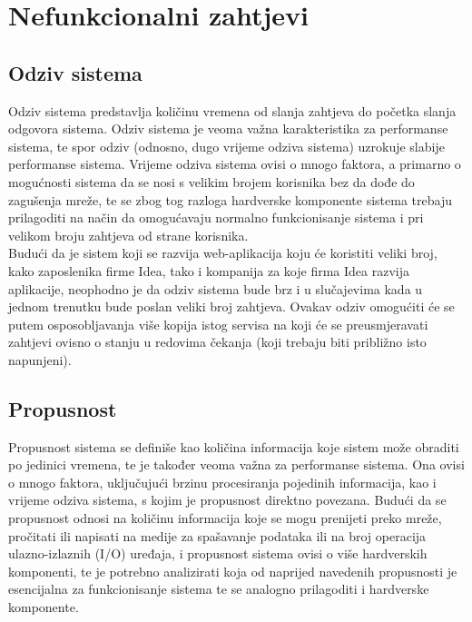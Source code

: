 \documentclass[12pt,a4paper]{article}
\begin{document}
\newpage

\section{Nefunkcionalni zahtjevi}

\subsection{Odziv sistema}

\quad Odziv sistema predstavlja količinu vremena od slanja zahtjeva do početka slanja odgovora sistema. Odziv sistema je veoma važna karakteristika za performanse sistema, te spor odziv (odnosno, dugo vrijeme odziva sistema) uzrokuje slabije performanse sistema. Vrijeme odziva sistema ovisi o mnogo faktora, a primarno o mogućnosti sistema da se nosi s velikim brojem korisnika bez da dođe do zagušenja mreže, te se zbog tog razloga hardverske komponente sistema trebaju prilagoditi na način da omogućavaju normalno funkcionisanje sistema i pri velikom broju zahtjeva od strane korisnika. \\

Budući da je sistem koji se razvija web-aplikacija koju će koristiti veliki broj, kako zaposlenika firme Idea, tako i kompanija za koje firma Idea razvija aplikacije, neophodno je da odziv sistema bude brz i u slučajevima kada u jednom trenutku bude poslan veliki broj zahtjeva. Ovakav odziv omogućiti će se putem osposobljavanja više kopija istog servisa na koji će se preusmjeravati zahtjevi ovisno o stanju u redovima čekanja (koji trebaju biti približno isto napunjeni).

\subsection{Propusnost}

\quad Propusnost sistema se definiše kao količina informacija koje sistem može obraditi po jedinici vremena, te je također veoma važna za performanse sistema. Ona ovisi o mnogo faktora, uključujući brzinu procesiranja pojedinih informacija, kao i vrijeme odziva sistema, s kojim je propusnost direktno povezana. Budući da se propusnost odnosi na količinu informacija koje se mogu prenijeti preko mreže, pročitati ili napisati na medije za spašavanje podataka ili na broj operacija ulazno-izlaznih (I/O) uređaja, i propusnost sistema ovisi o više hardverskih komponenti, te je potrebno analizirati koja od naprijed navedenih propusnosti je esencijalna za funkcionisanje sistema te se analogno prilagoditi i hardverske komponente. \\
\end{document}
